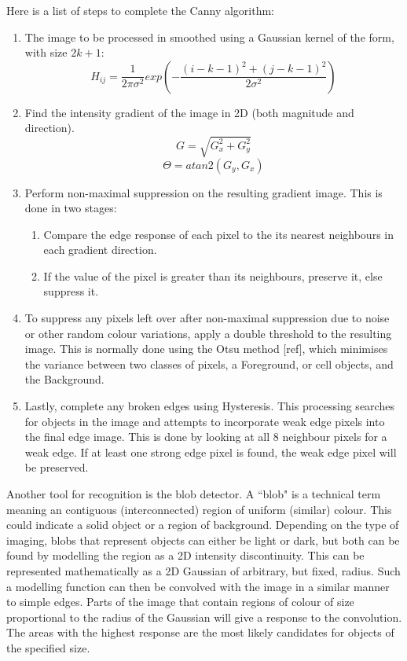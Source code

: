 Here is a list of steps to complete the Canny algorithm:
\begin{enumerate}
	\item The image to be processed in smoothed using a Gaussian kernel of the form, with size $2k + 1$:
	$$ H_{ij} = \frac{1}{2 \pi \sigma^2} exp \left( -\frac{(i - k - 1)^2 + (j - k - 1)^2}{2 \sigma^2} \right) $$
	\item Find the intensity gradient of the image in 2D (both magnitude and direction).
	$$ G = \sqrt{G^2_x + G^2_y} $$
	$$ \Theta = atan2(G_y, G_x) $$
	\item Perform non-maximal suppression on the resulting gradient image. This is done in two stages:
	\begin{enumerate}
		\item Compare the edge response of each pixel to the its nearest neighbours in each gradient direction.
		\item If the value of the pixel is greater than its neighbours, preserve it, else suppress it.
	\end{enumerate}
	\item To suppress any pixels left over after non-maximal suppression due to noise or other random colour variations, apply a double threshold to the resulting image. This is normally done using the Otsu method [ref], which minimises the variance between two classes of pixels, a Foreground, or cell objects, and the Background.
	\item Lastly, complete any broken edges using Hysteresis. This processing searches for objects in the image and attempts to incorporate weak edge pixels into the final edge image. This is done by looking at all 8 neighbour pixels for a weak edge. If at least one strong edge pixel is found, the weak edge pixel will be preserved.
\end{enumerate}

Another tool for recognition is the blob detector. A ``blob" is a technical term meaning an contiguous (interconnected) region of uniform (similar) colour. This could indicate a solid object or a region of background. Depending on the type of imaging, blobs that represent objects can either be light or dark, but both can be found by modelling the region as a 2D intensity discontinuity. This can be represented mathematically as a 2D Gaussian of arbitrary, but fixed, radius. Such a modelling function can then be convolved with the image in a similar manner to simple edges. Parts of the image that contain regions of colour of size proportional to the radius of the Gaussian will give a response to the convolution. The areas with the highest response are the most likely candidates for objects of the specified size.

